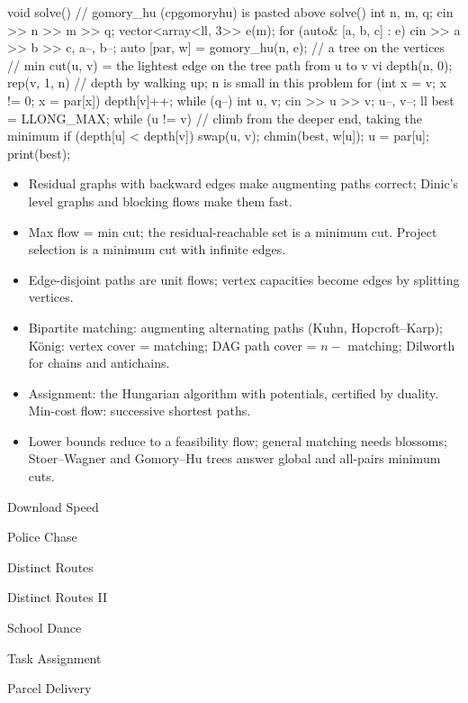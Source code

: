 \begin{code}
void solve() {  // gomory_hu (cpgomoryhu) is pasted above solve()
    int n, m, q;
    cin >> n >> m >> q;
    vector<array<ll, 3>> e(m);
    for (auto& [a, b, c] : e) cin >> a >> b >> c, a--, b--;
    auto [par, w] = gomory_hu(n, e);  // a tree on the vertices
    // min cut(u, v) = the lightest edge on the tree path from u to v
    vi depth(n, 0);
    rep(v, 1, n) {  // depth by walking up; n is small in this problem
        for (int x = v; x != 0; x = par[x]) depth[v]++;
    }
    while (q--) {
        int u, v;
        cin >> u >> v;
        u--, v--;
        ll best = LLONG_MAX;
        while (u != v) {  // climb from the deeper end, taking the minimum
            if (depth[u] < depth[v]) swap(u, v);
            chmin(best, w[u]);
            u = par[u];
        }
        print(best);
    }
}
\end{code}


\begin{summary}
\begin{itemize}
  \item Residual graphs with backward edges make augmenting paths correct; Dinic's level graphs and blocking flows make them fast.
  \item Max flow = min cut; the residual-reachable set is a minimum cut. Project selection is a minimum cut with infinite edges.
  \item Edge-disjoint paths are unit flows; vertex capacities become edges by splitting vertices.
  \item Bipartite matching: augmenting alternating paths (Kuhn, Hopcroft--Karp); König: vertex cover = matching; DAG path cover =
        $n -$ matching; Dilworth for chains and antichains.
  \item Assignment: the Hungarian algorithm with potentials, certified by duality. Min-cost flow: successive shortest paths.
  \item Lower bounds reduce to a feasibility flow; general matching needs blossoms; Stoer--Wagner and Gomory--Hu trees answer
        global and all-pairs minimum cuts.
\end{itemize}
\end{summary}

\begin{practice}
\begin{pplist}
  \item Download Speed
  \item Police Chase
  \item Distinct Routes
  \item Distinct Routes II
\end{pplist}
\begin{pplist}
  \item School Dance
  \item Task Assignment
  \item Parcel Delivery
\end{pplist}
\end{practice}
